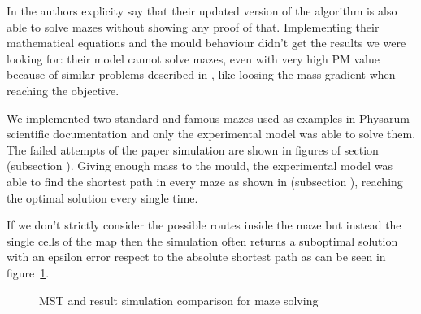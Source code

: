 \par
In \cite{Tsompanas2016} the authors explicity say that their updated version of the algorithm is also able to solve mazes without showing any proof of that. Implementing their mathematical equations and the mould behaviour didn't get the results we were looking for: their model cannot solve mazes, even with very high PM value because of similar problems described in , like loosing the mass gradient when reaching the objective.

\par
We implemented two standard and famous mazes used as examples in Physarum scientific documentation and only the experimental model was able to solve them. The failed attempts of the paper simulation are shown in figures of section  (subsection ).
Giving enough mass to the mould, the experimental model was able to find the shortest path in every maze as shown in  (subsection ), reaching the optimal solution every single time.

\par
If we don't strictly consider the possible routes inside the maze but instead the single cells of the map then the simulation often returns a suboptimal solution with an epsilon error respect to the absolute shortest path as can be seen in figure~\ref{fig:mst_tube}.

\begin{figure}[H]
    \centering
    \caption{MST and result simulation comparison for maze solving}
    \label{fig:mst_tube}
\end{figure}

